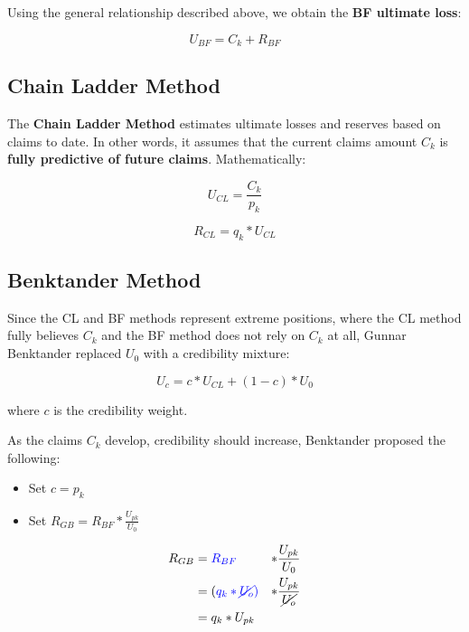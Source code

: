 \documentclass{article}
\begin{document}
Using the general relationship described above, we obtain the \textbf{BF
ultimate loss}:

\begin{equation}
  U_{BF} = C_k + R_{BF}
\end{equation}

\subsection{Chain Ladder Method }

The \textbf{Chain Ladder Method} estimates ultimate losses and reserves based
on claims to date. In other words, it assumes that the current claims amount
$C_k$ is \textbf{fully predictive of future claims}. Mathematically:

\begin{equation}
  U_{CL} = \frac{C_k}{p_k}
\end{equation}

\begin{equation}
  R_{CL} = q_k * U_{CL}
\end{equation}

\subsection{Benktander Method }

Since the CL and BF methods represent extreme positions, where the CL method
fully believes $C_k$ and the BF method does not rely on $C_k$ at all, Gunnar
Benktander replaced $U_0$ with a credibility mixture:

\begin{equation}
  U_c = c * U_{CL} + (1 - c) * U_0
\end{equation}

where $c$ is the credibility weight.

\bigskip

As the claims $C_k$ develop, credibility should increase, Benktander proposed
the following:

\begin{itemize}
  \item Set $c = p_k$
  \item Set $R_{GB} = R_{BF} * \frac{U_{pk}}{U_0}$
\end{itemize}

\begin{equation}
  \begin{aligned}
    R_{GB} &= \color{blue}{R_{BF}} &* \color{black}\frac{U_{pk}}{U_0} \\
    &= (\color{blue}{q_k * \cancel{U_o}}) &*
    \color{black}\frac{U_{pk}}{\cancel{U_o}} \\
    &= q_k * U_{pk}
  \end{aligned}
\end{equation}
\end{document}
